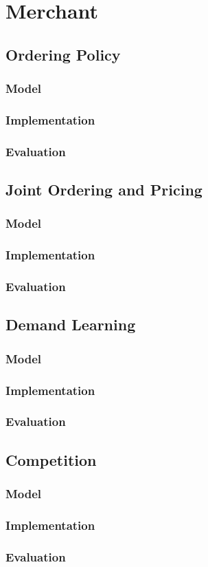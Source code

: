 
\chapter{Merchant}

\section{Ordering Policy}
\subsection{Model}
\subsection{Implementation}
\subsection{Evaluation}

\section{Joint Ordering and Pricing}
\subsection{Model}
\subsection{Implementation}
\subsection{Evaluation}

\section{Demand Learning}
\subsection{Model}
\subsection{Implementation}
\subsection{Evaluation}

\section{Competition}
\subsection{Model}
\subsection{Implementation}
\subsection{Evaluation}